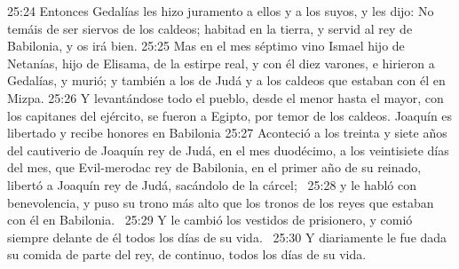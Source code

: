 25:24 Entonces Gedalías les hizo juramento a ellos y a los suyos, y les dijo: No temáis de ser siervos de los caldeos; habitad en la tierra, y servid al rey de Babilonia, y os irá bien. 
25:25 Mas en el mes séptimo vino Ismael hijo de Netanías, hijo de Elisama, de la estirpe real, y con él diez varones, e hirieron a Gedalías, y murió; y también a los de Judá y a los caldeos que estaban con él en Mizpa. 
25:26 Y levantándose todo el pueblo, desde el menor hasta el mayor, con los capitanes del ejército, se fueron a Egipto, por temor de los caldeos. 
Joaquín es libertado y recibe honores en Babilonia  
25:27 Aconteció a los treinta y siete años del cautiverio de Joaquín rey de Judá, en el mes duodécimo, a los veintisiete días del mes, que Evil-merodac rey de Babilonia, en el primer año de su reinado, libertó a Joaquín rey de Judá, sacándolo de la cárcel;  
25:28 y le habló con benevolencia, y puso su trono más alto que los tronos de los reyes que estaban con él en Babilonia.  
25:29 Y le cambió los vestidos de prisionero, y comió siempre delante de él todos los días de su vida.  
25:30 Y diariamente le fue dada su comida de parte del rey, de continuo, todos los días de su vida.